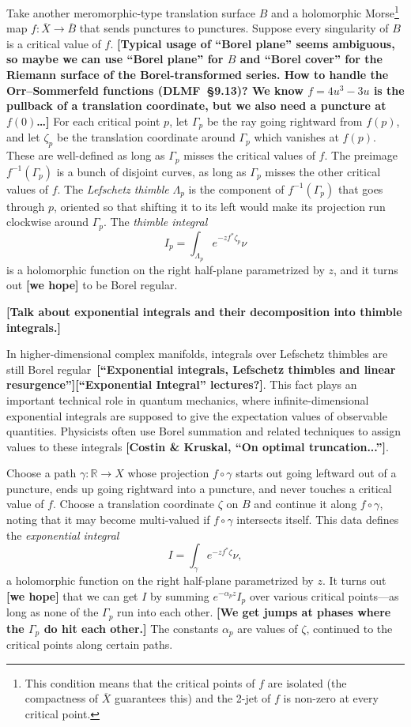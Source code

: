\documentclass{article}
\newcommand{\maps}{\colon}
\newcommand{\R}{\mathbb{R}}
\begin{document}
\begin{itemize}
Take another meromorphic-type translation surface $B$ and a holomorphic Morse\footnote{This condition means that the critical points of $f$ are isolated (the compactness of $\overline{X}$ guarantees this) and the 2-jet of $f$ is non-zero at every critical point.} map $f \maps \overline{X} \to \overline{B}$ that sends punctures to punctures. Suppose every singularity of $B$ is a critical value of $f$. \textbf{[Typical usage of ``Borel plane'' seems ambiguous, so maybe we can use ``Borel plane'' for $B$ and ``Borel cover'' for the Riemann surface of the Borel-transformed series. How to handle the Orr–Sommerfeld functions (DLMF~\S 9.13)? We know $f = 4u^3 - 3u$ is the pullback of a translation coordinate, but we also need a puncture at $f(0)$\ldots]} For each critical point $p$, let $\Gamma_p$ be the ray going rightward from $f(p)$, and let $\zeta_p$ be the translation coordinate around $\Gamma_p$ which vanishes at $f(p)$. These are well-defined as long as $\Gamma_p$ misses the critical values of $f$. The preimage $f^{-1}(\Gamma_p)$ is a bunch of disjoint curves, as long as $\Gamma_p$ misses the other critical values of $f$. The {\em Lefschetz thimble} $\Lambda_p$ is the component of $f^{-1}(\Gamma_p)$ that goes through $p$, oriented so that shifting it to its left would make its projection run clockwise around $\Gamma_p$. The {\em thimble integral}
\[ I_p = \int_{\Lambda_p} e^{-z f^*\zeta_p} \nu \]
is a holomorphic function on the right half-plane parametrized by $z$, and it turns out \textbf{[we hope]} to be Borel regular.

\textbf{[Talk about exponential integrals and their decomposition into thimble integrals.]}

In higher-dimensional complex manifolds, integrals over Lefschetz thimbles are still Borel regular~\textbf{[``Exponential integrals, Lefschetz thimbles and linear resurgence''][``Exponential Integral'' lectures?]}. This fact plays an important technical role in quantum mechanics, where infinite-dimensional exponential integrals are supposed to give the expectation values of observable quantities. Physicists often use Borel summation and related techniques to assign values to these integrals \textbf{[Costin \& Kruskal, ``On optimal truncation...'']}.

\color{Turquoise}
Choose a path $\gamma \maps \R \to X$ whose projection $f \circ \gamma$ starts out going leftward out of a puncture, ends up going rightward into a puncture, and never touches a critical value of $f$. Choose a translation coordinate $\zeta$ on $B$ and continue it along $f \circ \gamma$, noting that it may become multi-valued if $f \circ \gamma$ intersects itself. This data defines the {\em exponential integral}
\[ I = \int_\gamma e^{-z f^*\zeta} \nu, \]
a holomorphic function on the right half-plane parametrized by $z$. It turns out \textbf{[we hope]} that we can get $I$ by summing $e^{-\alpha_p z} I_p$ over various critical points---as long as none of the $\Gamma_p$ run into each other. \textbf{[We get jumps at phases where the $\Gamma_p$ do hit each other.]} The constants $\alpha_p$ are values of $\zeta$, continued to the critical points along certain paths.
\color{black}
\end{itemize}
\end{document}
